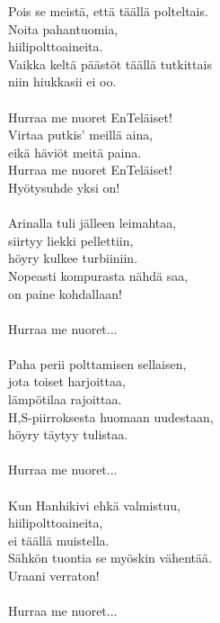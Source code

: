 
Pois se meistä, että täällä polteltais. \\ Noita pahantuomia, \\ hiilipolttoaineita. \\ Vaikka keltä päästöt täällä tutkittais \\ niin hiukkasii ei oo. \\ \hspace{10mm} \\ Hurraa me nuoret EnTeläiset! \\ Virtaa putkis' meillä aina, \\ eikä häviöt meitä paina. \\ Hurraa me nuoret EnTeläiset! \\ Hyötysuhde yksi on! \\ \hspace{10mm} \\ Arinalla tuli jälleen leimahtaa, \\ siirtyy liekki pellettiin, \\ höyry kulkee turbiiniin. \\ Nopeasti kompurasta nähdä saa, \\ on paine kohdallaan! \\ \hspace{10mm} \\ Hurraa me nuoret... \\ \hspace{10mm} \\ Paha perii polttamisen sellaisen, \\ jota toiset harjoittaa, \\ lämpötilaa rajoittaa. \\ H,S-piirroksesta huomaan uudestaan, \\ höyry täytyy tulistaa. \\ \hspace{10mm} \\ Hurraa me nuoret... \\ \hspace{10mm} \\ Kun Hanhikivi ehkä valmistuu, \\ hiilipolttoaineita, \\ ei täällä muistella. \\ Sähkön tuontia se myöskin vähentää. \\ Uraani verraton! \\ \hspace{10mm} \\ Hurraa me nuoret...